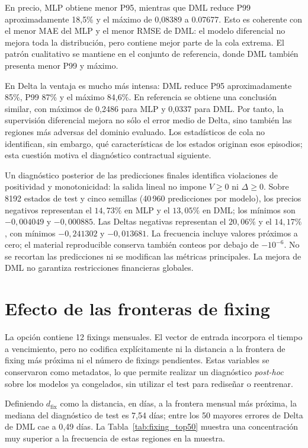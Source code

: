 En precio, MLP obtiene menor P95, mientras que DML reduce P99 aproximadamente
18{,}5\% y el máximo de 0{,}08389 a 0.07677. Esto es coherente con el menor MAE
del MLP y el menor RMSE de DML: el modelo diferencial no mejora toda la distribución,
pero contiene mejor parte de la cola extrema. El patrón cualitativo se mantiene en el conjunto
de referencia, donde DML también presenta menor P99 y máximo.

En Delta la ventaja es mucho más intensa: DML reduce P95 aproximadamente 85\%, P99
87\% y el máximo 84{,}6\%. En referencia se obtiene una conclusión similar, con máximos
de 0{,}2486 para MLP y 0{,}0337 para DML. Por tanto, la supervisión diferencial mejora no
sólo el error medio de Delta, sino también las regiones más adversas del dominio evaluado.
Los estadísticos de cola no identifican, sin embargo, qué características de los estados
originan esos episodios; esta cuestión motiva el diagnóstico contractual siguiente.

Un diagnóstico posterior de las predicciones finales identifica violaciones de
positividad y monotonicidad: la salida lineal no impone $V\geq0$ ni $\Delta\geq0$.
Sobre 8192 estados de test y cinco semillas (40\,960 predicciones por modelo),
los precios negativos representan el $14{,}73\%$ en MLP y el $13{,}05\%$ en DML;
los mínimos son $-0{,}004049$ y $-0{,}000885$. Las Deltas negativas representan
el $20{,}06\%$ y el $14{,}17\%$, con mínimos $-0{,}241302$ y $-0{,}013681$.
La frecuencia incluye valores próximos a cero; el material reproducible conserva
también conteos por debajo de $-10^{-6}$. No se recortan las predicciones ni se
modifican las métricas principales. La mejora de DML no garantiza restricciones
financieras globales.

\section{Efecto de las fronteras de fixing}
\label{sec:fixing_boundaries}

La opción contiene 12 fixings mensuales. El vector de entrada incorpora el tiempo a
vencimiento, pero no codifica explícitamente ni la distancia a la frontera de fixing más
próxima ni el número de fixings pendientes. Estas variables se conservaron como metadatos,
lo que permite realizar un diagnóstico \textit{post-hoc} sobre los modelos ya congelados,
sin utilizar el test para rediseñar o reentrenar.

Definiendo $d_{\mathrm{fix}}$ como la distancia, en días, a la frontera mensual más próxima,
la mediana del diagnóstico de test es 7{,}54 días; entre los 50 mayores errores de Delta de
DML cae a 0{,}49 días. La Tabla~\ref{tab:fixing_top50} muestra una concentración muy
superior a la frecuencia de estas regiones en la muestra.

